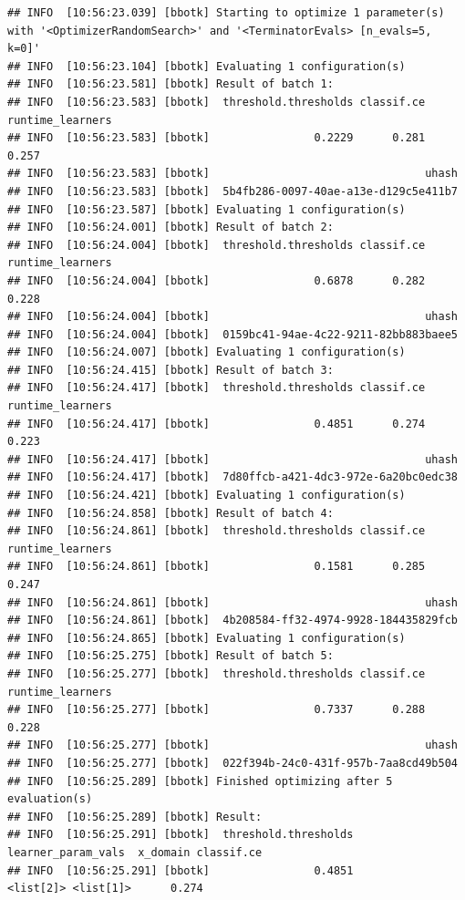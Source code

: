 \documentclass[
]{scrbook}
\begin{document}
\begin{verbatim}
## INFO  [10:56:23.039] [bbotk] Starting to optimize 1 parameter(s) with '<OptimizerRandomSearch>' and '<TerminatorEvals> [n_evals=5, k=0]' 
## INFO  [10:56:23.104] [bbotk] Evaluating 1 configuration(s) 
## INFO  [10:56:23.581] [bbotk] Result of batch 1: 
## INFO  [10:56:23.583] [bbotk]  threshold.thresholds classif.ce runtime_learners 
## INFO  [10:56:23.583] [bbotk]                0.2229      0.281            0.257 
## INFO  [10:56:23.583] [bbotk]                                 uhash 
## INFO  [10:56:23.583] [bbotk]  5b4fb286-0097-40ae-a13e-d129c5e411b7 
## INFO  [10:56:23.587] [bbotk] Evaluating 1 configuration(s) 
## INFO  [10:56:24.001] [bbotk] Result of batch 2: 
## INFO  [10:56:24.004] [bbotk]  threshold.thresholds classif.ce runtime_learners 
## INFO  [10:56:24.004] [bbotk]                0.6878      0.282            0.228 
## INFO  [10:56:24.004] [bbotk]                                 uhash 
## INFO  [10:56:24.004] [bbotk]  0159bc41-94ae-4c22-9211-82bb883baee5 
## INFO  [10:56:24.007] [bbotk] Evaluating 1 configuration(s) 
## INFO  [10:56:24.415] [bbotk] Result of batch 3: 
## INFO  [10:56:24.417] [bbotk]  threshold.thresholds classif.ce runtime_learners 
## INFO  [10:56:24.417] [bbotk]                0.4851      0.274            0.223 
## INFO  [10:56:24.417] [bbotk]                                 uhash 
## INFO  [10:56:24.417] [bbotk]  7d80ffcb-a421-4dc3-972e-6a20bc0edc38 
## INFO  [10:56:24.421] [bbotk] Evaluating 1 configuration(s) 
## INFO  [10:56:24.858] [bbotk] Result of batch 4: 
## INFO  [10:56:24.861] [bbotk]  threshold.thresholds classif.ce runtime_learners 
## INFO  [10:56:24.861] [bbotk]                0.1581      0.285            0.247 
## INFO  [10:56:24.861] [bbotk]                                 uhash 
## INFO  [10:56:24.861] [bbotk]  4b208584-ff32-4974-9928-184435829fcb 
## INFO  [10:56:24.865] [bbotk] Evaluating 1 configuration(s) 
## INFO  [10:56:25.275] [bbotk] Result of batch 5: 
## INFO  [10:56:25.277] [bbotk]  threshold.thresholds classif.ce runtime_learners 
## INFO  [10:56:25.277] [bbotk]                0.7337      0.288            0.228 
## INFO  [10:56:25.277] [bbotk]                                 uhash 
## INFO  [10:56:25.277] [bbotk]  022f394b-24c0-431f-957b-7aa8cd49b504 
## INFO  [10:56:25.289] [bbotk] Finished optimizing after 5 evaluation(s) 
## INFO  [10:56:25.289] [bbotk] Result: 
## INFO  [10:56:25.291] [bbotk]  threshold.thresholds learner_param_vals  x_domain classif.ce 
## INFO  [10:56:25.291] [bbotk]                0.4851          <list[2]> <list[1]>      0.274
\end{verbatim}
\end{document}

